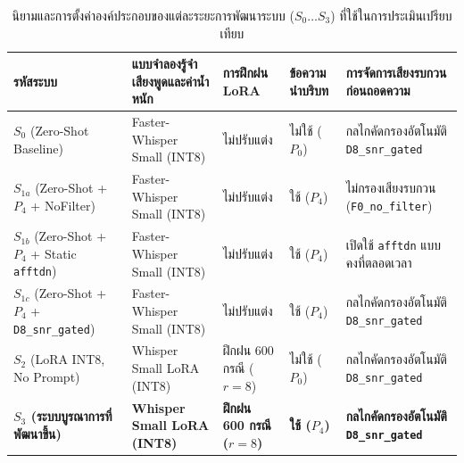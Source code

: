 \begin{table}[H]
\centering
\caption{นิยามและการตั้งค่าองค์ประกอบของแต่ละระยะการพัฒนาระบบ ($S_0 \dots S_3$) ที่ใช้ในการประเมินเปรียบเทียบ}
\label{tab:sysdef}
\small\setlength{\tabcolsep}{3.5pt}
\begin{tabular}{|p{3.4cm}|p{3.0cm}|>{\centering\arraybackslash}p{2.2cm}|>{\centering\arraybackslash}p{1.9cm}|p{3.5cm}|}
\hline
\textbf{รหัสระบบ} & \textbf{แบบจำลองรู้จำเสียงพูดและค่าน้ำหนัก} & \textbf{การฝึกฝน LoRA} & \textbf{ข้อความนำบริบท} & \textbf{การจัดการเสียงรบกวนก่อนถอดความ} \\
\hline
$S_0$ (Zero-Shot Baseline) & Faster-Whisper Small (INT8) & ไม่ปรับแต่ง & ไม่ใช้ ($P_0$) & กลไกคัดกรองอัตโนมัติ \texttt{D8\_snr\_gated} \\
\hline
$S_{1a}$ (Zero-Shot + $P_4$ + NoFilter) & Faster-Whisper Small (INT8) & ไม่ปรับแต่ง & ใช้ ($P_4$) & ไม่กรองเสียงรบกวน (\texttt{F0\_no\_filter}) \\
\hline
$S_{1b}$ (Zero-Shot + $P_4$ + Static \texttt{afftdn}) & Faster-Whisper Small (INT8) & ไม่ปรับแต่ง & ใช้ ($P_4$) & เปิดใช้ \texttt{afftdn} แบบคงที่ตลอดเวลา \\
\hline
$S_{1c}$ (Zero-Shot + $P_4$ + \texttt{D8\_snr\_gated}) & Faster-Whisper Small (INT8) & ไม่ปรับแต่ง & ใช้ ($P_4$) & กลไกคัดกรองอัตโนมัติ \texttt{D8\_snr\_gated} \\
\hline
$S_2$ (LoRA INT8, No Prompt) & Whisper Small LoRA (INT8) & ฝึกฝน 600 กรณี ($r=8$) & ไม่ใช้ ($P_0$) & กลไกคัดกรองอัตโนมัติ \texttt{D8\_snr\_gated} \\
\hline
\textbf{$S_3$ (ระบบบูรณาการที่พัฒนาขึ้น)} & \textbf{Whisper Small LoRA (INT8)} & \textbf{ฝึกฝน 600 กรณี ($r=8$)} & \textbf{ใช้ ($P_4$)} & \textbf{กลไกคัดกรองอัตโนมัติ \texttt{D8\_snr\_gated}} \\
\hline
\end{tabular}
\end{table}